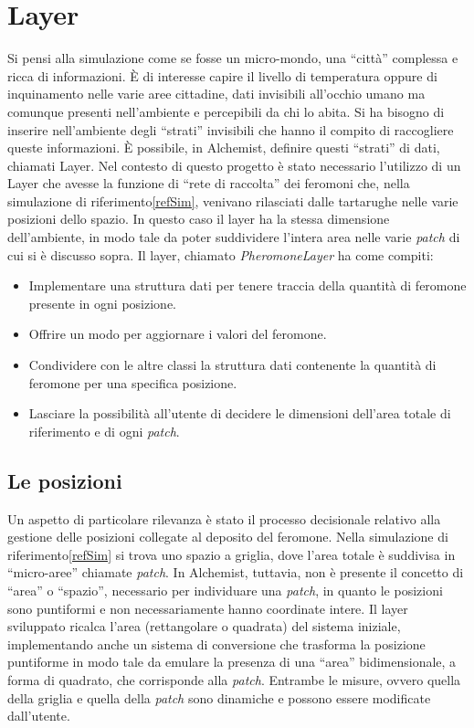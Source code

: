 \documentclass[12pt,a4paper,openright,twoside]{book}
\begin{document}
\section{Layer}
Si pensi alla simulazione come se fosse un micro-mondo, una ``città'' complessa
e ricca di informazioni. È di interesse capire il livello di temperatura oppure di inquinamento nelle varie aree cittadine, dati invisibili
all'occhio umano ma comunque presenti nell'ambiente e percepibili da chi lo abita. Si ha bisogno
di inserire nell'ambiente degli ``strati'' invisibili che hanno il compito di raccogliere queste informazioni.
È possibile, in Alchemist, definire questi ``strati'' di dati, chiamati Layer.
\newline
Nel contesto di questo progetto è stato necessario l'utilizzo di un Layer che avesse la funzione di ``rete di raccolta''
dei feromoni che, nella simulazione di riferimento\space\ref{refSim}, venivano rilasciati dalle tartarughe nelle varie posizioni
dello spazio. In questo caso il layer ha la stessa dimensione dell'ambiente, in modo tale da poter suddividere l'intera area nelle varie \textit{patch} di cui si 
è discusso sopra.
Il layer, chiamato \textit{PheromoneLayer} ha come compiti:
\begin{itemize}
    \item Implementare una struttura dati per tenere traccia della quantità di feromone presente in ogni posizione.
    \item Offrire un modo per aggiornare i valori del feromone.
    \item Condividere con le altre classi la struttura dati contenente la quantità di feromone per una specifica posizione.
    \item Lasciare la possibilità all'utente di decidere le dimensioni dell'area totale di riferimento e di ogni \textit{patch}.
\end{itemize}

\subsection{Le posizioni}
Un aspetto di particolare rilevanza è stato il processo decisionale relativo alla gestione delle posizioni collegate 
al deposito del feromone. Nella simulazione di riferimento\space\ref{refSim} si trova uno spazio a griglia, dove l'area totale è suddivisa
in ``micro-aree'' chiamate \textit{patch}. In Alchemist, tuttavia, non è presente il concetto di ``area'' o ``spazio'', necessario per individuare una \textit{patch},
in quanto le posizioni sono puntiformi e non necessariamente hanno coordinate intere. Il layer sviluppato ricalca l'area (rettangolare o quadrata) del sistema iniziale,
implementando anche un sistema di conversione che trasforma la posizione puntiforme in modo tale da emulare la presenza di una ``area'' bidimensionale, a forma di quadrato, che corrisponde alla \textit{patch}.
Entrambe le misure, ovvero quella della griglia e quella della \textit{patch} sono dinamiche e possono essere modificate dall'utente.
\end{document}
